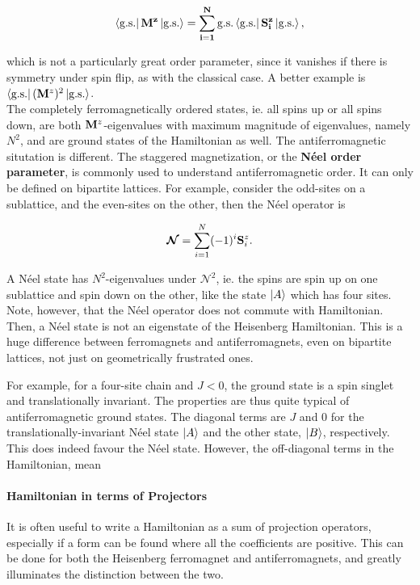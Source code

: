 \documentclass{homework}
\begin{document}
$$
    \bra{\textnormal{g.s.}} {\bf M}^z \ket{\textnormal{g.s.}} = \sum_{i=1}^N \textnormal{g.s.} \bra{\textnormal{g.s.}} {\bf S}_i^z \ket{\textnormal{g.s.}},
$$

which is not a particularly great order parameter, since it vanishes if there is symmetry under spin flip, as with the classical case. A better example is $\bra{\textnormal{g.s.}} ({\bf M}^z)^2 \ket{\textnormal{g.s.}}$. \\

The completely ferromagnetically ordered states, ie. all spins up or all spins down, are both ${\bf M}^z$-eigenvalues with maximum magnitude of eigenvalues, namely $N^2$, and are ground states of the Hamiltonian as well. The antiferromagnetic situtation is different. The staggered magnetization, or the \textbf{Néel order parameter}, is commonly used to understand antiferromagnetic order. It can only be defined on bipartite lattices. For example, consider the odd-sites on a sublattice, and the even-sites on the other, then the Néel operator is 

$$
    \bm{\mathcal N} = \sum_{i=1}^N (-1)^i {\bf S}_i^z.
$$

A Néel state has $N^2$-eigenvalues under $\bm{\mathcal N}^2$, ie. the spins are spin up on one sublattice and spin down on the other, like the state $\ket{A}$ which has four sites. Note, however, that the Néel operator does not commute with Hamiltonian. Then, a Néel state is not an eigenstate of the Heisenberg Hamiltonian. This is a huge difference between ferromagnets and antiferromagnets, even on bipartite lattices, not just on geometrically frustrated ones. 

For example, for a four-site chain and $J<0$, the ground state is a spin singlet and translationally invariant. The properties are thus quite typical of antiferromagnetic ground states. The diagonal terms are $J$ and $0$ for the translationally-invariant Néel state $\ket{A}$ and the other state, $\ket{B}$, respectively. This does indeed favour the Néel state. However, the off-diagonal terms in the Hamiltonian, mean \\

\clearpage

\paragraph{\textbf{Hamiltonian in terms of Projectors}}

It is often useful to write a Hamiltonian as a sum of projection operators, especially if a form can be found where all the coefficients are positive. This can be done for both the Heisenberg ferromagnet and antiferromagnets, and greatly illuminates the distinction between the two. \\
\end{document}
